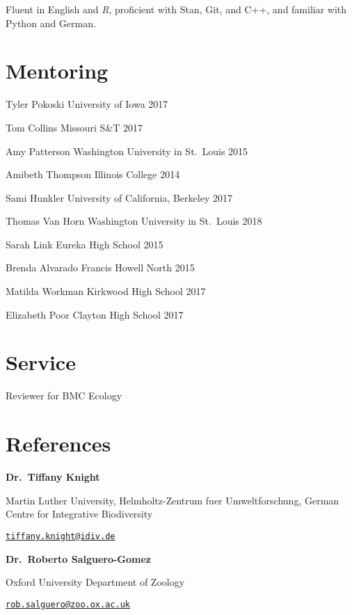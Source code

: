\documentclass[11pt,]{article}
\begin{document}
Fluent in English and \emph{R}, proficient with Stan, Git, and C++, and
familiar with Python and German.

\section{Mentoring}\label{mentoring}

Tyler Pokoski \hfill  University of Iowa 2017

Tom Collins \hfill Missouri S\&T 2017

Amy Patterson \hfill Washington University in St.~Louis 2015

Amibeth Thompson \hfill Illinois College 2014

Sami Hunkler \hfill University of California, Berkeley 2017

Thomas Van Horn \hfill Washington University in St.~Louis 2018

Sarah Link \hfill Eureka High School 2015

Brenda Alvarado \hfill Francis Howell North 2015

Matilda Workman \hfill Kirkwood High School 2017

Elizabeth Poor \hfill Clayton High School 2017

\section{Service}\label{service}

Reviewer for BMC Ecology

\section{References}\label{references}

\textbf{Dr.~Tiffany Knight}

Martin Luther University, Helmholtz-Zentrum fuer Umweltforschung, German
Centre for Integrative Biodiversity

\href{mailto:tiffany.knight@idiv.de}{\nolinkurl{tiffany.knight@idiv.de}}

\textbf{Dr.~Roberto Salguero-Gomez}

Oxford University Department of Zoology

\href{mailto:rob.salguero@zoo.ox.ac.uk}{\nolinkurl{rob.salguero@zoo.ox.ac.uk}}
\end{document}
